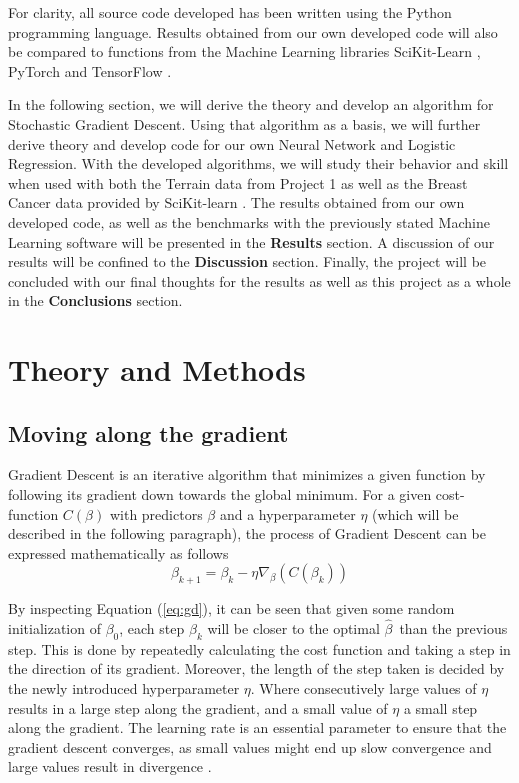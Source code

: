 \documentclass
[twocolumn,
secnumarabic,
nobibnotes,
aps,
prl,
reprint,
groupedaddress,
amsmath,
amssymb
]{revtex4-2}
\begin{document}
For clarity, all source code developed has been written using the Python programming language. Results obtained from our own developed code will also be compared to functions from the Machine Learning libraries SciKit-Learn \cite{scikit-learn}, PyTorch \cite{paszke2019} and TensorFlow \cite{tensorflow2015-whitepaper}.

In the following section, we will derive the theory and develop an algorithm for Stochastic Gradient Descent. Using that algorithm as a basis, we will further derive theory and develop code for our own Neural Network and Logistic Regression. With the developed algorithms, we will study their behavior and skill when used with both the Terrain data from Project 1 as well as the Breast Cancer data provided by SciKit-learn \cite{scikit-learn}. The results obtained from our own developed code, as well as the benchmarks with the previously stated Machine Learning software will be presented in the \textbf{Results} section. A discussion of our results will be confined to the \textbf{Discussion} section. Finally, the project will be concluded with our final thoughts for the results as well as this project as a whole in the \textbf{Conclusions} section.

\section{Theory and Methods}
\subsection{Moving along the gradient}
Gradient Descent is an iterative algorithm that minimizes a given function by following its gradient down towards the global minimum. For a given cost-function $C(\beta)$ with predictors $\beta$ and a hyperparameter $\eta$ (which will be described in the following paragraph), the process of Gradient Descent can be expressed mathematically as follows
\begin{equation}
  \label{eq:gd}
  \beta_{k+1} = \beta_k - \eta\nabla_\beta\left(C(\beta_k)\right)
\end{equation}

By inspecting Equation (\ref{eq:gd}), it can be seen that given some random initialization of $\beta_0$, each step $\beta_k$ will be closer to the optimal $\hat{\beta}$ than the previous step. This is done by repeatedly calculating the cost function and taking a step in the direction of its gradient. Moreover, the length of the step taken is decided by the newly introduced hyperparameter $\eta$. Where consecutively large values of $\eta$ results in a large step along the gradient, and a small value of $\eta$ a small step along the gradient. The learning rate is an essential parameter to ensure that the gradient descent converges, as small values might end up slow convergence and large values result in divergence \cite{Geron2019}.
\end{document}
